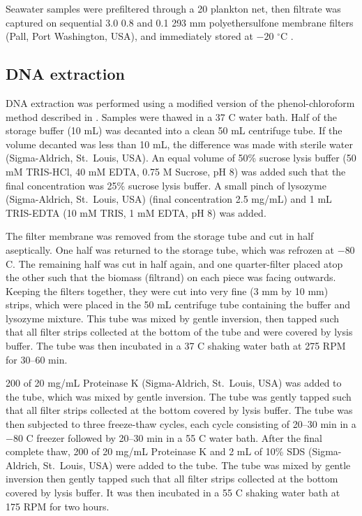 Seawater samples were prefiltered through a 20 \micron{} plankton net, then filtrate was captured on sequential 3.0 \micron{} 0.8 \micron{} and 0.1 \micron{} 293 mm polyethersulfone membrane filters (Pall, Port Washington, USA), and immediately stored at $-20$ $^\circ$C \cite{Rusch:2007ez,Ng:2010cd}.

\subsection{DNA extraction}

DNA extraction was performed using a modified version of the phenol-chloroform method described in \citet{Rusch:2007ez}.
Samples were thawed in a 37 \textdegree{}C water bath.
Half of the storage buffer (\textapprox{}10 mL) was decanted into a clean 50 mL centrifuge tube.
If the volume decanted was less than 10 mL, the difference was made with sterile water (Sigma-Aldrich, St.\ Louis, USA).
An equal volume of 50\% sucrose lysis buffer (50 mM TRIS-HCl, 40 mM EDTA, 0.75 M Sucrose, pH 8) was added such that the final concentration was 25\% sucrose lysis buffer.
A small pinch of lysozyme (Sigma-Aldrich, St.\ Louis, USA) (final concentration \textapprox{}2.5 mg/mL) and 1 mL TRIS-EDTA (10 mM TRIS, 1 mM EDTA, pH 8) was added.

The filter membrane was removed from the storage tube and cut in half aseptically.
One half was returned to the storage tube, which was refrozen at $-80$ \textdegree{}C.
The remaining half was cut in half again, and one quarter-filter placed atop the other such that the biomass (filtrand) on each piece was facing outwards.
Keeping the filters together, they were cut into very fine (\textapprox{}3 mm by 10 mm) strips, which were placed in the 50 mL centrifuge tube containing the buffer and lysozyme mixture.
This tube was mixed by gentle inversion, then tapped such that all filter strips collected at the bottom of the tube and were covered by lysis buffer.
The tube was then incubated in a 37 \textdegree{}C shaking water bath at 275 RPM for 30--60 min.

200 \microlitre{} of 20 mg/mL Proteinase K (Sigma-Aldrich, St.\ Louis, USA) was added to the tube, which was mixed by gentle inversion.
The tube was gently tapped such that all filter strips collected at the bottom covered by lysis buffer.
The tube was then subjected to three freeze-thaw cycles, each cycle consisting of 20--30 min in a $-80$ \textdegree{}C freezer followed by 20--30 min in a 55 \textdegree{}C water bath.
After the final complete thaw, 200 \microlitre{} of 20 mg/mL Proteinase K and 2 mL of 10\% SDS (Sigma-Aldrich, St.\ Louis, USA) were added to the tube.
The tube was mixed by gentle inversion then gently tapped such that all filter strips collected at the bottom covered by lysis buffer.
It was then incubated in a 55 \textdegree{}C shaking water bath at 175 RPM for two hours.


